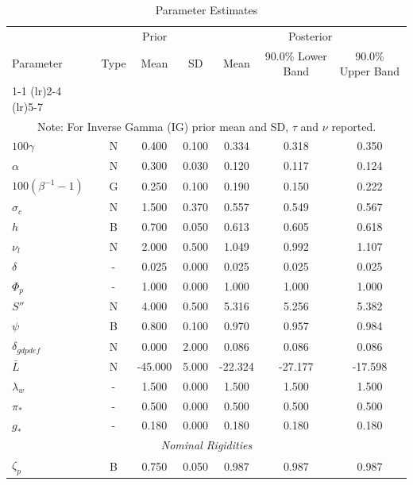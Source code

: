 \documentclass[12pt]{article}
\begin{document}
\pagestyle{empty}
\vspace*{.5cm}
{\small
\begin{longtable}{lcccccc}
\caption{Parameter Estimates}
\\ \hline
\multicolumn{1}{c}{} & \multicolumn{3}{c}{Prior} & \multicolumn{3}{c}{Posterior} \\
Parameter & Type & Mean & SD & Mean & 90.0\% {\tiny Lower Band} & 90.0\% {\tiny Upper Band} \\
\cmidrule(lr){1-1} \cmidrule(lr){2-4} \cmidrule(lr){5-7}
\endhead
\hline
\\ \multicolumn{7}{c}{\footnotesize Note: For Inverse Gamma (IG) prior mean and SD, $\tau$ and $\nu$ reported.}
\endfoot
\multicolumn{7}{c}{\textit{Steady State}} \\[3pt]
$100\gamma$ & N &    0.400 &    0.100 &    0.334 &    0.318 &    0.350 \\
$\alpha$ & N &    0.300 &    0.030 &    0.120 &    0.117 &    0.124 \\
$100(\beta^{-1} - 1)$ & G &    0.250 &    0.100 &    0.190 &    0.150 &    0.222 \\
$\sigma_{c}$ & N &    1.500 &    0.370 &    0.557 &    0.549 &    0.567 \\
$   h$ & B &    0.700 &    0.050 &    0.613 &    0.605 &    0.618 \\
$\nu_l$ & N &    2.000 &    0.500 &    1.049 &    0.992 &    1.107 \\
$\delta$ & - &    0.025 &    0.000 &    0.025 &    0.025 &    0.025 \\
$\Phi_p$ & - &    1.000 &    0.000 &    1.000 &    1.000 &    1.000 \\
$ S''$ & N &    4.000 &    0.500 &    5.316 &    5.256 &    5.382 \\
$\psi$ & B &    0.800 &    0.100 &    0.970 &    0.957 &    0.984 \\
$\delta_{gdpdef}$ & N &    0.000 &    2.000 &    0.086 &    0.086 &    0.086 \\
$\bar{L}$ & N &  -45.000 &    5.000 &  -22.324 &  -27.177 &  -17.598 \\
$\lambda_w$ & - &    1.500 &    0.000 &    1.500 &    1.500 &    1.500 \\
$\pi_*$ & - &    0.500 &    0.000 &    0.500 &    0.500 &    0.500 \\
$ g_*$ & - &    0.180 &    0.000 &    0.180 &    0.180 &    0.180 \\
\multicolumn{7}{c}{\textit{Nominal Rigidities}} \\[3pt]
$\zeta_p$ & B &    0.750 &    0.050 &    0.987 &    0.987 &    0.987 \\

\end{longtable}}
\end{document}
